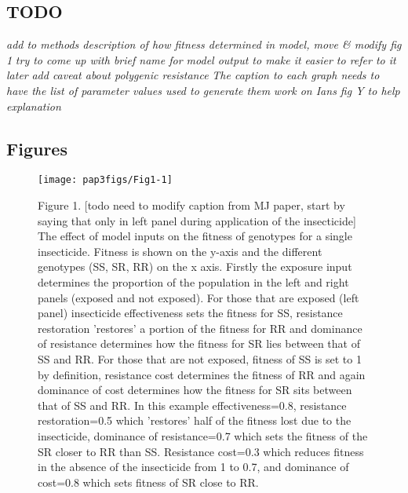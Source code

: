 \documentclass[11pt,]{article}
\begin{document}
\subsection{TODO}\label{todo}

\emph{add to methods description of how fitness determined in model,
move \& modify fig 1} \emph{try to come up with brief name for model
output to make it easier to refer to it later} \emph{add caveat about
polygenic resistance} \emph{The caption to each graph needs to have the
list of parameter values used to generate them} \emph{work on Ians fig Y
to help explanation}

\pagebreak

\subsection{Figures}\label{figures}

\begin{figure}

\texttt{[image: pap3figs/Fig1-1]} \hfill{}

\caption{Figure 1. [todo need to modify caption from MJ paper, start by saying that only in left panel during application of the insecticide] The effect of model inputs on the fitness of genotypes for a single insecticide. Fitness is shown on the y-axis and the different genotypes (SS, SR, RR) on the x axis. Firstly the exposure input determines the proportion of the population in the left and right panels (exposed and not exposed). For those that are exposed (left panel) insecticide effectiveness sets the fitness for SS, resistance restoration 'restores' a portion of the fitness for RR and dominance of resistance determines how the fitness for SR lies between that of SS and RR. For those that are not exposed, fitness of SS is set to 1 by definition, resistance cost determines the fitness of RR and again dominance of cost determines how the fitness for SR sits between that of SS and RR. In this example effectiveness=0.8, resistance restoration=0.5 which 'restores' half of the fitness lost due to the insecticide, dominance of resistance=0.7 which sets the fitness of the SR closer to RR than SS. Resistance cost=0.3 which reduces fitness in the absence of the insecticide from 1 to 0.7, and dominance of cost=0.8 which sets fitness of SR close to RR.}\label{fig:Fig1}
\end{figure}

\pagebreak
\end{document}

